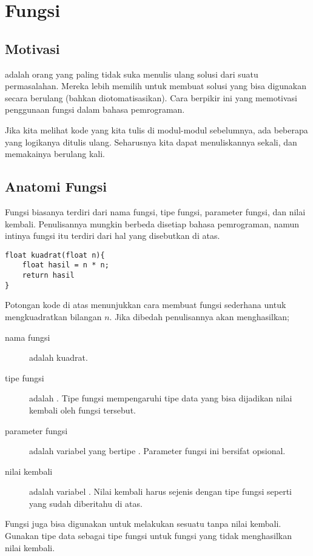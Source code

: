 \documentclass[../main.tex]{subfiles}
\begin{document}
\chapter{Fungsi}
\section{Motivasi}
 adalah orang yang paling tidak suka menulis ulang solusi dari
suatu permasalahan. Mereka lebih memilih untuk membuat solusi yang bisa
digunakan secara berulang (bahkan diotomatisasikan). Cara berpikir ini yang
memotivasi penggunaan fungsi dalam bahasa pemrograman.

Jika kita melihat kode yang kita tulis di modul-modul sebelumnya, ada beberapa
yang logikanya ditulis ulang. Seharusnya kita dapat menuliskannya sekali,
dan memakainya berulang kali.

\section{Anatomi Fungsi}

Fungsi biasanya terdiri dari nama fungsi, tipe fungsi, parameter fungsi, dan
nilai kembali. Penulisannya mungkin berbeda disetiap bahasa pemrograman, namun
intinya fungsi itu terdiri dari hal yang disebutkan di atas.

\begin{verbatim}
float kuadrat(float n){
	float hasil = n * n;
	return hasil
}
\end{verbatim}

Potongan kode di atas menunjukkan cara membuat fungsi sederhana untuk
mengkuadratkan bilangan \(n\). Jika dibedah penulisannya akan menghasilkan;

\begin{description}
	\item[nama fungsi] adalah kuadrat.
	\item[tipe fungsi] adalah . Tipe fungsi mempengaruhi tipe data
	yang bisa dijadikan nilai kembali oleh fungsi tersebut.
	\item[parameter fungsi] adalah variabel  yang bertipe .
	Parameter fungsi ini bersifat opsional.
	\item[nilai kembali] adalah variabel . Nilai kembali harus
	sejenis dengan tipe fungsi seperti yang sudah diberitahu di atas.
\end{description}

Fungsi juga bisa digunakan untuk melakukan sesuatu tanpa nilai kembali. Gunakan
tipe data  sebagai tipe fungsi untuk fungsi yang tidak menghasilkan
nilai kembali.
\end{document}
